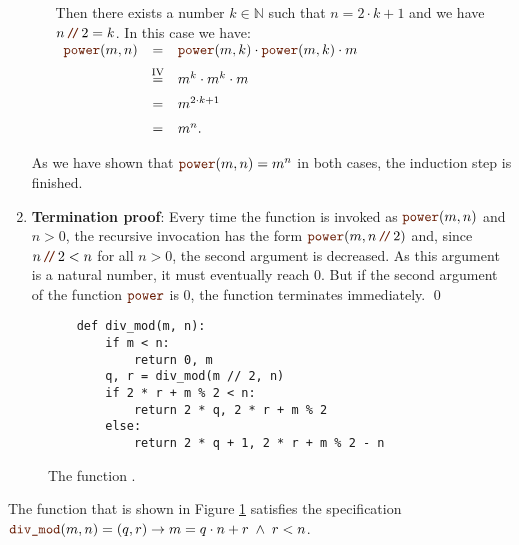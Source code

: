 \begin{enumerate}
\begin{enumerate}
            Then there exists a number $k \in \mathbb{N}$ such that $n = 2 \cdot k + 1$ and we have
            $n \dv 2 = k$.  In this case we have:
            \\[0.2cm]
            \hspace*{1.3cm}
            $ 
            \begin{array}{lcl}
            \mytt{power}(m,n) & = & \mytt{power}(m,k) \cdot \mytt{power}(m,k) \cdot m  \\[0.2cm]
                                & \stackrel{\mathrm{IV}}{=} & m^k \cdot m^k \cdot m  \\[0.2cm]
                                & = & m^{2\cdot k+1} \\[0.2cm]
                                & = & m^{n}.
            \end{array}
            $
      \end{enumerate}
      As we have shown that $\mytt{power}(m,n) = m^n$ in both cases, the induction step is finished. \mycheck
\item \textbf{Termination proof}:
      Every time the function  is invoked as $\mytt{power}(m, n)$ and $n > 0$, the recursive
      invocation has the form $\mytt{power}(m,n \dv 2)$ and, since $n \dv 2 < n$ for all $n > 0$, the second
      argument is decreased.  As this argument is a natural number, it must eventually reach $0$.  But if the
      second argument of the function $\mytt{power}$ is $0$, the function terminates immediately. \mycheck
      \qed
\end{enumerate}

\begin{figure}[!h]
  \centering
\begin{verbatim}
    def div_mod(m, n):
        if m < n:
            return 0, m
        q, r = div_mod(m // 2, n)
        if 2 * r + m % 2 < n:
            return 2 * q, 2 * r + m % 2
        else:
            return 2 * q + 1, 2 * r + m % 2 - n                
\end{verbatim}
\vspace*{-0.3cm}
  \caption{The function .}
  \label{fig:div_mod}
\end{figure} 


\exampleEng
The function  that is shown in Figure \ref{fig:div_mod} satisfies the specification
\\[0.2cm]
\hspace*{1.3cm}
$\mytt{div\_mod}(m, n) = (q, r)  \rightarrow m = q \cdot n + r \;\wedge\; r < n$. \eox



